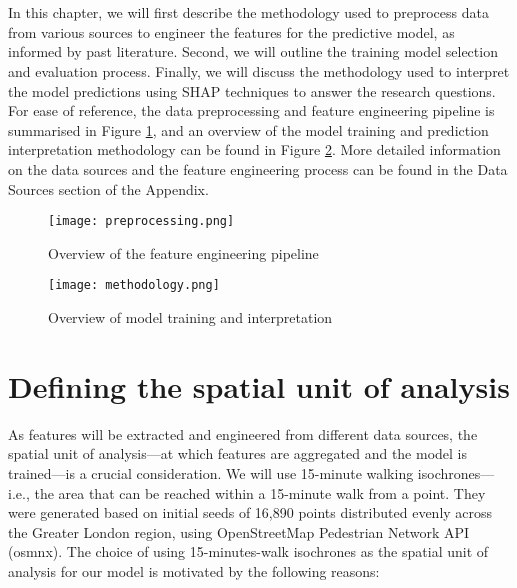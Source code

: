 \section*{}

In this chapter, we will first describe the methodology used to preprocess data from various sources to engineer the features for the predictive model, as informed by past literature. Second, we will outline the training model selection and evaluation process. Finally, we will discuss the methodology used to interpret the model predictions using SHAP techniques to answer the research questions. For ease of reference, the data preprocessing and feature engineering pipeline is summarised in Figure \ref{fig:preprocessing}, and an overview of the model training and prediction interpretation methodology can be found in Figure \ref{fig:methodology}. More detailed information on the data sources and the feature engineering process can be found in the Data Sources section of the Appendix.

\begin{figure}[!ht]
    \centering
    \texttt{[image: preprocessing.png]}
    \caption{Overview of the feature engineering pipeline}
    \label{fig:preprocessing}
\end{figure}

\begin{figure}[!ht]
    \centering
    \texttt{[image: methodology.png]}
    \caption{Overview of model training and interpretation}
    \label{fig:methodology}
\end{figure}

\pagebreak %
\section{Defining the spatial unit of analysis}

As features will be extracted and engineered from different data sources, the spatial unit of analysis---at which features are aggregated and the model is trained---is a crucial consideration. We will use 15-minute walking isochrones---i.e., the area that can be reached within a 15-minute walk from a point. They were generated based on initial seeds of 16,890 points distributed evenly across the Greater London region, using OpenStreetMap Pedestrian Network API (osmnx). The choice of using 15-minutes-walk isochrones as the spatial unit of analysis for our model is motivated by the following reasons: 


